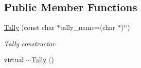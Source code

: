 \subsection*{Public Member Functions}
\begin{DoxyCompactItemize}
\item 
\hyperlink{classTally_a95563c7f8706efd453c6902b3c6179b1}{Tally} (const char $\ast$tally\-\_\-name=(char $\ast$)\char`\"{}\char`\"{})
\begin{DoxyCompactList}\small\item\em \hyperlink{classTally}{Tally} constructor. \end{DoxyCompactList}\item 
\hypertarget{classTally_a3e6eaab67081636b9112148102eb5899}{virtual \hyperlink{classTally_a3e6eaab67081636b9112148102eb5899}{$\sim$\-Tally} ()}\label{classTally_a3e6eaab67081636b9112148102eb5899}


\end{DoxyCompactItemize}
